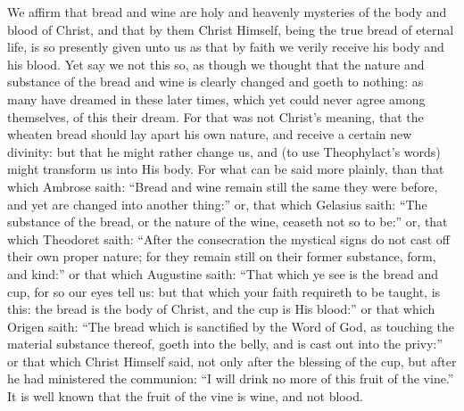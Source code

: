 We affirm that bread and wine are holy and heavenly mysteries of
the body and blood of Christ, and that by them Christ Himself, being
the true bread of eternal life, is so presently given unto us as that
by faith we verily receive his body and his blood. Yet say we
not this so, as though we thought that the nature and substance of the
bread and wine is clearly changed and goeth to nothing: as many have
dreamed in these later times, which yet could never agree among themselves,
of this their
dream. For that was not Christ’s meaning, that the wheaten
bread should lay apart his own nature, and receive a certain new divinity:
but that he might rather change us, and (to use Theophylact’s
words) might transform us into His body. For what can be said
more plainly, than that which Ambrose saith: “Bread and wine remain
still the same they were before, and yet are changed into another thing:”
or, that which Gelasius saith: “The substance of the bread, or
the nature of the wine, ceaseth not so to be:” or, that which
Theodoret saith: “After the consecration the mystical signs do
not cast off their own proper nature; for they remain still on their
former substance, form, and kind:” or that which Augustine saith:
“That which ye see is the bread and cup, for so our eyes tell
us: but that which your faith requireth to be taught, is this: the bread
is the body of Christ, and the cup is His blood:” or that which
Origen saith: “The bread which is sanctified by the Word of God,
as touching the material substance thereof, goeth into the belly, and
is cast out into the privy:” or that which Christ Himself said,
not only after the blessing of the cup, but after he had ministered
the communion: “I will drink no more of this fruit of the vine.”
It is well known that the fruit of the vine is wine, and not blood.

